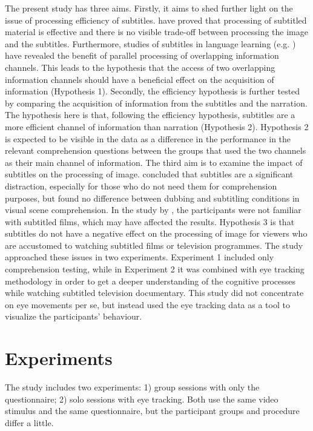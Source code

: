 \documentclass[output=paper]{langsci/langscibook}
\begin{document}
The present study has three aims. Firstly, it aims to shed further light on the issue of processing efficiency of subtitles. \citet{Perego2010} have proved that processing of subtitled material is effective and there is no visible trade-off between processing the image and the subtitles. Furthermore, studies of subtitles in language learning (e.g. \citealt{mitterer2009}) have revealed the benefit of parallel processing of overlapping information channels. This leads to the hypothesis that the access of two overlapping information channels should have a beneficial effect on the acquisition of information (Hypothesis 1). Secondly, the efficiency hypothesis \citep{dydewalle1987} is further tested by comparing the acquisition of information from the subtitles and the narration. The hypothesis here is that, following the efficiency hypothesis, subtitles are a more efficient channel of information than narration (Hypothesis 2). Hypothesis 2 is expected to be visible in the data as a difference in the performance in the relevant comprehension questions between the groups that used the two channels as their main channel of information. The third aim is to examine the impact of subtitles on the processing of image. \citet{lavaur2011} concluded that subtitles are a significant distraction, especially for those who do not need them for comprehension purposes, but \citet{Perego2010} found no difference between dubbing and subtitling conditions in visual scene comprehension. In the study by \citet{lavaur2011}, the participants were not familiar with subtitled films, which may have affected the results. Hypothesis 3 is that subtitles do not have a negative effect on the processing of image for viewers who are accustomed to watching subtitled films or television programmes. The study approached these issues in two experiments. Experiment 1 included only comprehension testing, while in Experiment 2 it was combined with eye tracking methodology in order to get a deeper understanding of the cognitive processes while watching subtitled television documentary. This study did not concentrate on eye movements per se, but instead used the eye tracking data as a tool to visualize the participants' behaviour.

\section{Experiments}

The study includes two experiments: 1) group sessions with only the questionnaire; 2) solo sessions with eye tracking. Both use the same video stimulus and the same questionnaire, but the participant groups and procedure differ a little. 
\end{document}
